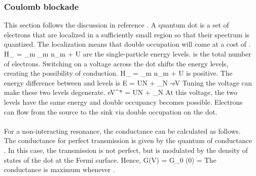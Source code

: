 \documentclass[12pt,twoside]{report}
\numberwithin{equation}{section}
\begin{document}
\subsubsection{Coulomb blockade}
This section follows the discussion in reference \cite{piers}. A quantum dot is a set of electrons that are localized in a sufficiently small region so that their spectrum is quantized.
The localization means that double occupation will come at a cost of .
\beq
H_ = \sum_{m\sigma} \epsilon_m n_{m\sigma} + U
\eeq
{} are the single-particle energy levels.
 is the total number of electrons.
 Switching on a voltage  across the dot shifts the energy levels, creating the possibility of conduction.
\beq
H_ = \sum_{m\sigma}  n_{m\sigma} + U
\eeq
{} is positive.
The energy difference between  and  levels is
\beq
\Delta E = UN + \epsilon_{N} -eV
\eeq
Tuning the voltage can make these two levels degenerate.
\beq
eV^* = UN + \epsilon_{N}
\eeq
At this voltage, the two levels have the same energy and double occupancy becomes possible.
Electrons can flow from the source to the sink via double occupation on the dot.\\\\
For a non-interacting resonance, the conductance can be calculated as follows.
The conductance for perfect transmission is given by the quantum of conductance .
In this case, the transmission is not perfect, but is modulated by the density of states of the dot at the Fermi surface.
Hence,
\beq
G(V) = G_0 \rho(0) =  
\eeq
The conductance is maximum whenever .
\end{document}
